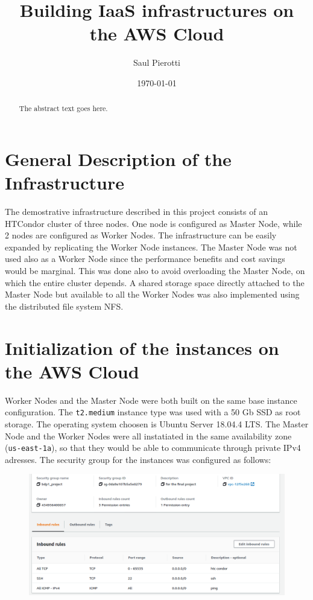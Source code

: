 \documentclass{article}
\begin{document}
\title{Building IaaS infrastructures on the AWS Cloud}
\author{Saul Pierotti}
\date{\today}

\maketitle

\begin{abstract}
The abstract text goes here.
\end{abstract}

\section{General Description of the Infrastructure}
The demostrative infrastructure described in this project consists of an HTCondor cluster of three nodes.
One node is configured as Master Node, while 2 nodes are configured as Worker Nodes.
The infrastructure can be easily expanded by replicating the Worker Node instances.
The Master Node was not used also as a Worker Node since the performance benefits and cost savings would be marginal.
This was done also to avoid overloading the Master Node, on which the entire cluster depends.
A shared storage space directly attached to the Master Node but available to all the Worker Nodes was also implemented using the distributed file system NFS.

\section{Initialization of the instances on the AWS Cloud}
Worker Nodes and the Master Node were both built on the same base instance configuration.
The \texttt{t2.medium} instance type was used with a 50 Gb SSD as root storage.
The operating system choosen is Ubuntu Server 18.04.4 LTS.
The Master Node and the Worker Nodes were all instatiated in the same availability zone (\texttt{us-east-1a}), so that they would be able to communicate through private IPv4 adresses.
The security group for the instances was configured as follows:

\begin{figure}[!h]
	\center
	\includegraphics[width=\textwidth]{./images/security-group.png}
\end{figure}
\end{document}
